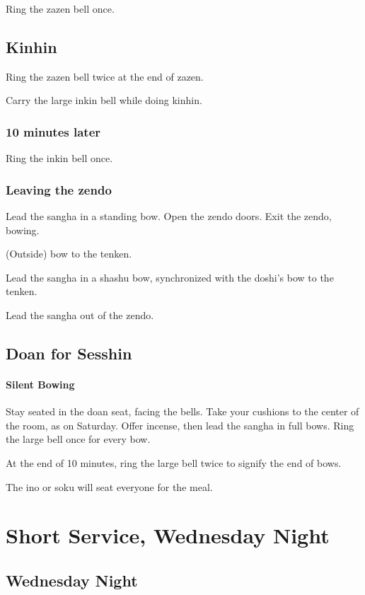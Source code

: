\documentclass{chantbook}
\begin{document}
\doan Ring the zazen bell once. \bigspace\zazenbell

\chapter{Kinhin}
\doan Ring the zazen bell twice at the end of zazen.
\kinhinBells

Carry the large inkin bell while doing kinhin.

\section*{10 minutes later}

\doan Ring the inkin bell once. \bigspace\zazenbell

\section*{Leaving the zendo}
\doshi Lead the sangha in a standing bow.
\tenken Open the zendo doors.
\doshi Exit the zendo, bowing.

(Outside) bow to the tenken.

\doan Lead the sangha in a shashu bow, synchronized with the doshi's bow to the
tenken.

Lead the sangha out of the zendo.

\chapter{Doan for Sesshin}
\subsection*{Silent Bowing}
\doan Stay seated in the doan seat, facing the bells.
\sangha Take your cushions to the center of the room, as on Saturday.
\doshi Offer incense, then lead the sangha in full bows.
\doan Ring the large bell once for every bow. \bigspace\largebell

At the end of 10 minutes, ring the large bell twice to signify the end of bows.

\bline{\hfill\largebell\hfill\largebell\hfill\null}

The ino or soku will seat everyone for the meal.

\part{Short Service, Wednesday Night}
\chapter{Wednesday Night}
\end{document}
